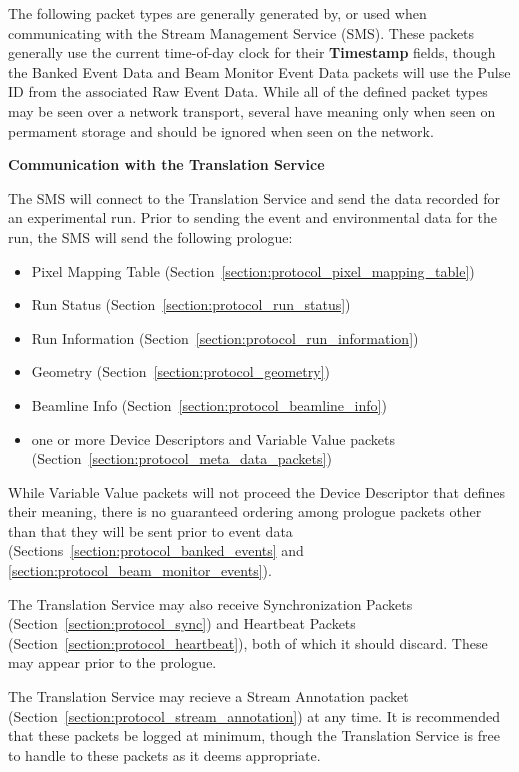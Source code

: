 The following packet types are generally generated by, or used when
communicating with the Stream Management Service (SMS). These packets generally
use the current time-of-day clock for their {\bf Timestamp} fields, though the
Banked Event Data and Beam Monitor Event Data packets will use the Pulse ID
from the associated Raw Event Data.  While all of the defined packet types may
be seen over a network transport, several have meaning only when seen on
permament storage and should be ignored when seen on the network.

{\large \bf Communication with the Translation Service}

The SMS will connect to the Translation Service and send the data recorded
for an experimental run. Prior to sending the event and environmental data
for the run, the SMS will send the following prologue:
\begin{itemize}
\item Pixel Mapping Table (Section~\ref{section:protocol_pixel_mapping_table})
\item Run Status (Section~\ref{section:protocol_run_status})
\item Run Information (Section~\ref{section:protocol_run_information})
\item Geometry (Section~\ref{section:protocol_geometry})
\item Beamline Info (Section~\ref{section:protocol_beamline_info})
\item one or more Device Descriptors and Variable Value packets
(Section~\ref{section:protocol_meta_data_packets})
\end{itemize}
While Variable Value packets will not proceed the Device Descriptor that
defines their meaning, there is no guaranteed ordering among prologue
packets other than that they will be sent prior to event data
(Sections~\ref{section:protocol_banked_events} and
\ref{section:protocol_beam_monitor_events}).

The Translation Service
may also receive Synchronization Packets (Section~\ref{section:protocol_sync})
and Heartbeat Packets (Section~\ref{section:protocol_heartbeat}), both of
which it should discard. These may appear prior to the prologue.

The Translation Service may recieve a Stream Annotation packet
(Section~\ref{section:protocol_stream_annotation}) at any time. It is
recommended that these packets be logged at minimum, though the Translation
Service is free to handle to these packets as it deems appropriate.

